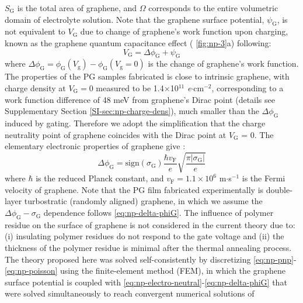 $S_{\mathrm{G}}$ is the total area of graphene, and $\Omega$
corresponds to the entire volumetric domain of electrolyte
solution. Note that the graphene surface potential,
$\psi_{\mathrm{G}}$, is not equivalent to $V_{\mathrm{G}}$ due to
change of graphene's work function upon charging, known as the
graphene quantum capacitance effect\cite{Xia_2009_qc_measure} (
\autoref{fig:np-3}a) following:
\begin{equation}
  \label{eq:np-Vg}
  V_{\mathrm{G}} = \Delta \phi_{\mathrm{G}} + \psi_{\mathrm{G}}
\end{equation}
where
$\Delta \phi_{\mathrm{G}} = \phi_{\mathrm{G}}(V_{\mathrm{g}}) -
\phi_{\mathrm{G}}(V_{\mathrm{g}}=0)$ is the change of graphene’s work
function. The properties of the PG samples fabricated is close to
intrinsic graphene, with charge density at $V_{\mathrm{G}}=0$ measured
to be 1.4$\times$10$^{11}$ \textit{e}$\cdot$cm$^{-2}$, corresponding
to a work function difference of 48 meV from graphene's Dirac point
(details see Supplementary Section \autoref{SI-sec:np-charge-dens}), much
smaller than the $\Delta \phi_{\mathrm{G}}$ induced by gating.
Therefore we adopt the simplification that the charge neutrality point
of graphene coincides with the Dirac point at $V_{\mathrm{G}}$ =
0. The elementary electronic properties of graphene give
:
\begin{equation}
  \label{eq:np-delta-phiG}
  \Delta \phi_{\mathrm{G}} = \mathrm{sign}(\sigma_{\mathrm{G}}) \frac{\hbar v_{\mathrm{F}}}{e}
  \sqrt{\frac{\pi |\sigma_{\mathrm{G}}|}{e}}
\end{equation}
where $\hbar$ is the reduced Planck constant, and
$v_{\mathrm{F}}=1.1\times10^{6}$ m$\cdot$s$^{-1}$ is the Fermi
velocity of graphene.  Note that the PG film fabricated experimentally
is double-layer turbostratic (randomly aligned) graphene, in which we
assume the $\Delta \phi_{\mathrm{G}} - \sigma_{\mathrm{G}}$ dependence
follows  \autoref{eq:np-delta-phiG}. The influence of polymer residue on
the surface of graphene is not considered in the current theory due
to: (i) insulating polymer residues do not respond to the gate voltage
and (ii) the thickness of the polymer residue is minimal after the
thermal annealing process. The theory proposed here was solved
self-consistently by discretizing
 \autoref{eq:np-pnp}-\autoref{eq:np-poisson} using the finite-element method
(FEM), in which the graphene surface potential is coupled with
 \autoref{eq:np-electro-neutral}-\autoref{eq:np-delta-phiG} that were solved
simultaneously to reach convergent numerical solutions of
